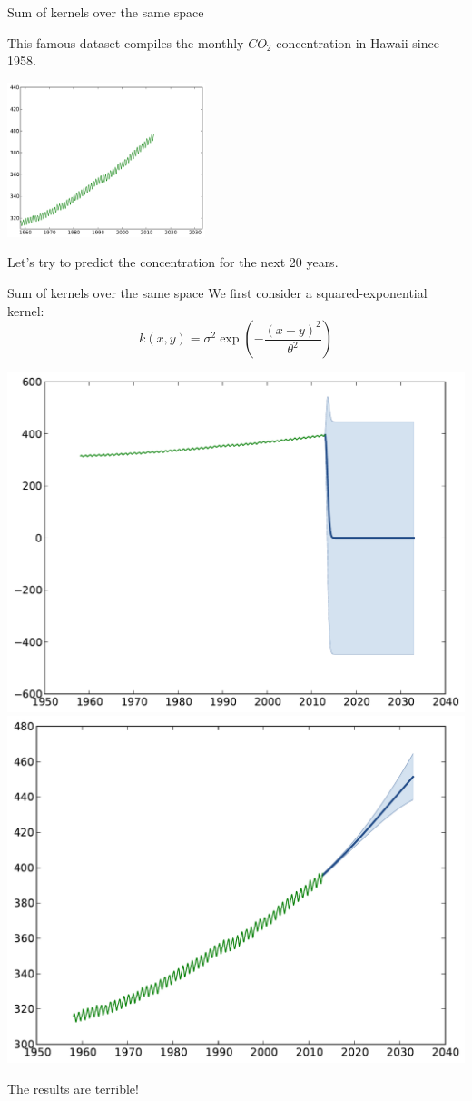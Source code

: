 \documentclass{beamer}
\begin{document}

\begin{frame}{Sum of kernels over the same space }
\begin{example}
This famous dataset compiles the monthly $CO_2$ concentration in Hawaii since 1958.
\begin{center}
\includegraphics[height=4.5cm]{figures/python/CO2-data}
\end{center}
Let's try to predict the concentration for the next 20 years.
\end{example}
\end{frame}

\begin{frame}{Sum of kernels over the same space }
We first consider a squared-exponential kernel: 
$$ \displaystyle k(x,y) = \sigma^2\exp \left(-\frac{(x-y)^2}{\theta^2} \right)$$
\begin{center}
\includegraphics[width=.48\textwidth]{figures/python/CO2-rbfa} \hfill \includegraphics[width=.48\textwidth]{figures/python/CO2-rbfb}
\end{center}
\vspace{5mm}
\begin{block}{}
\centering
\alert{The results are terrible!}
\end{block}
\end{frame}
\end{document}
